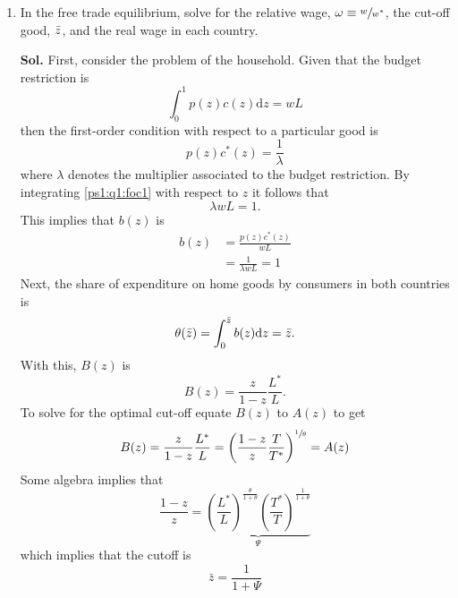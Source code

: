 \documentclass[12pt,oneside,reqno]{amsart}
\begin{document}
\begin{enumerate}[leftmargin=*]
    \item In the free trade equilibrium, solve for the relative wage, $\omega \equiv \sfrac{w}{w^*}$, the cut-off good, $\Bar{z}$, and the real wage in each country.
    \item[\textbf{Sol.}] First, consider the problem of the household. Given that the budget restriction is 
    \begin{equation*}
        \int_0^1p(z)c(z)\mathrm{d}z = wL
    \end{equation*}
    then the first-order condition with respect to a particular good is 
    \begin{equation}\label{ps1:q1:foc1}
        p(z)c^*(z) = \frac{1}{\lambda}
    \end{equation}
    where $\lambda$ denotes the multiplier associated to the budget restriction. By integrating \eqref{ps1:q1:foc1} with respect to $z$ it follows that 
    \begin{equation*}
        \lambda wL =1.
    \end{equation*}
    This implies that $b(z)$ is 
    \begin{align*}
        b(z) &= \frac{p(z)c^*(z)}{wL} \\ 
             &= \frac{1}{\lambda wL} = 1
    \end{align*}
    Next, the share of expenditure on home goods by consumers in both countries is 
    \begin{equation*}
        \theta(\bar{z}) = \int_0^{\Bar{z}} b(z)\mathrm{d}z = \Bar{z}.
    \end{equation*}
    With this, $B(z)$ is 
    \begin{equation*}
        B(z) = \frac{z}{1-z}\frac{L^*}{L}.
    \end{equation*}
    To solve for the optimal cut-off equate $B(z)$ to $A(z)$ to get 
    \begin{equation*}
        B(z) = \frac{z}{1-z}\frac{L^*}{L} = \left(\frac{1-z}{z}\frac{T}{T^*}\right)^{\sfrac{1}{\theta}} = A(z)
    \end{equation*}
    Some algebra implies that 
    \begin{equation*}
        \frac{1-z}{z} = \underbrace{\left(\frac{L^*}{L}\right)^{\frac{\theta}{1+\theta}} \left(\frac{T^*}{T}\right)^{\frac{1}{1+\theta}}}_{\Psi}
    \end{equation*}
    which implies that the cutoff is 
    \begin{equation}
        \bar{z} = \frac{1}{1+\Psi}

\end{equation}
\end{enumerate}
\end{document}
